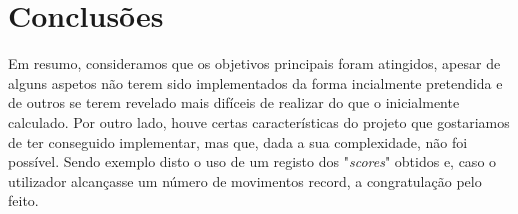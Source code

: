 \documentclass[a4paper]{article}
\begin{document}
\section{Conclusões}
\label{sec:conclusao}

Em resumo, consideramos que os objetivos principais foram atingidos, apesar de alguns aspetos não terem sido implementados da forma incialmente pretendida e de outros se terem revelado mais difíceis de realizar do que o inicialmente calculado. Por outro lado, houve certas características do projeto que gostariamos de ter conseguido implementar, mas que, dada a sua complexidade, não foi possível. Sendo exemplo disto o uso de um registo dos "\textit{scores}" obtidos e, caso o utilizador alcançasse um número de movimentos record, a congratulação pelo feito. 
\end{document}
